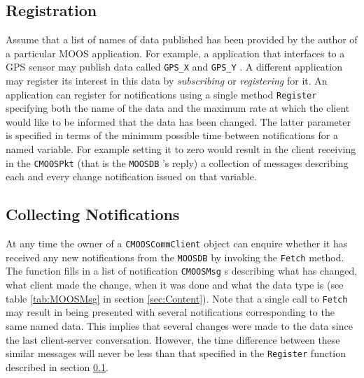 \documentclass[a4paper,10pt]{article}
\newcommand{\Code}[1]{\texttt{#1} }
\newcommand{\code}[1]{\Code{#1} }
\newcommand{\DB}   {\code{{MOOSDB}}}
\begin{document}
\subsection{Registration}\label{sec:Registration} Assume that a
list of names of data published has been provided by the author of
a particular MOOS application. For example, a application that
interfaces to a GPS sensor may publish data called \code{GPS\_X}
and \code{GPS\_Y}. A different application may register its
interest in this data by {\it{subscribing }} or {\it{registering}}
for it. An application can register for  notifications using a
single method \code{Register} specifying both the name of the data
and the maximum rate at which the client would like to be informed
that the data has been changed. The latter parameter is specified
in terms of the minimum possible time between notifications for a
named variable. For example setting it to zero would result in the
client receiving in the \code{CMOOSPkt} (that is the \DB's reply)
a collection of messages describing each and every change
notification issued on that variable.

\subsection{Collecting Notifications}\label{sec:CollectingNotifications}
At any time the owner of a \code{CMOOSCommClient} object can
enquire whether it has received any new notifications from the \DB
by invoking the \code{Fetch} method. The function fills in a list
of notification \code{CMOOSMsg}s describing what has changed, what
client made the change, when it was done and what the data type is
(see table \ref{tab:MOOSMsg} in section \ref{sec:Content}). Note
that a single call to \code{Fetch} may result in being presented
with several notifications corresponding to the same named data.
This implies that several changes were made to the data since the
last client-server conversation. However, the time difference
between these similar messages will never be less than that
specified in the \code{Register} function described in section
\ref{sec:Registration}.
\end{document}
